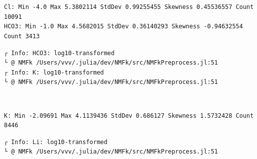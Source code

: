 \documentclass[11pt]{article}
\begin{document}
    \begin{center}
    \end{center}
    { \hspace*{\fill} \\}
    
    \begin{center}
    \end{center}
    { \hspace*{\fill} \\}
    
    \begin{Verbatim}[commandchars=\\\{\}]
Cl: Min -4.0 Max 5.3802114 StdDev 0.99255455 Skewness 0.45536557 Count 10091
HCO3: Min -1.0 Max 4.5682015 StdDev 0.36140293 Skewness -0.94632554 Count 3413
    \end{Verbatim}

    \begin{Verbatim}[commandchars=\\\{\}]
┌ Info: HCO3: log10-transformed
└ @ NMFk /Users/vvv/.julia/dev/NMFk/src/NMFkPreprocess.jl:51
┌ Info: K: log10-transformed
└ @ NMFk /Users/vvv/.julia/dev/NMFk/src/NMFkPreprocess.jl:51
    \end{Verbatim}

    \begin{center}
    \end{center}
    { \hspace*{\fill} \\}
    
    \begin{Verbatim}[commandchars=\\\{\}]
K: Min -2.09691 Max 4.1139436 StdDev 0.686127 Skewness 1.5732428 Count 8446
    \end{Verbatim}

    \begin{Verbatim}[commandchars=\\\{\}]
┌ Info: Li: log10-transformed
└ @ NMFk /Users/vvv/.julia/dev/NMFk/src/NMFkPreprocess.jl:51
    \end{Verbatim}

    \begin{center}
    \end{center}
    { \hspace*{\fill} \\}
    
\end{document}
